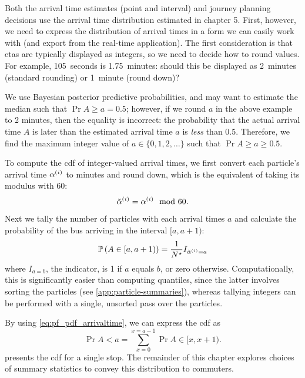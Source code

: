 Both the arrival time estimates (point and interval) and journey planning decisions use the arrival time distribution estimated in chapter 5. First, however, we need to express the distribution of arrival times in a form we can easily work with (and export from the real-time application). The first consideration is that \glspl{eta} are typically displayed as integers, so we need to decide how to round values. For example, 105~seconds is 1.75~minutes: should this be displayed as 2~minutes (standard rounding) or 1~minute (round down)?


We use Bayesian posterior predictive probabilities, and may want to estimate the median such that $\Pr{A \geq a} = 0.5$; however, if we round $a$ in the above example to 2 minutes, then the equality is incorrect: the probability that the actual arrival time $A$ is later than the estimated arrival time $a$ is \emph{less} than 0.5. Therefore, we find the maximum integer value of $a \in \{0, 1, 2, \ldots\}$ such that $\Pr{A \geq a} \geq 0.5$.


To compute the \gls{cdf} of integer-valued arrival times, we first convert each particle's arrival time $\alpha^{(i)}$ to minutes and round down, which is the equivalent of taking its modulus with 60:
\begin{equation}
\label{eq:particle_eta_modulus}
\breve{\alpha}^{(i)} = \alpha^{(i)} \mod 60.
\end{equation}
Next we tally the number of particles with each arrival times $a$ and calculate the probability of the bus arriving in the interval $[a,a+1)$:
\begin{equation}
\label{eq:pf_pdf_arrivaltime}
\mathbb{P}\left(A \in [a, a+1)\right) =
\frac{1}{N^\star} I_{\breve{\alpha}^{(i)} = a}
\end{equation}
where $I_{a=b}$, the indicator, is 1 if $a$ equals $b$, or zero otherwise. Computationally, this is significantly easier than computing quantiles, since the latter involves sorting the particles (see \cref{app:particle-summaries}), whereas tallying integers can be performed with a single, unsorted pass over the particles.


By using \cref{eq:pf_pdf_arrivaltime}, we can express the \gls{cdf} as
\begin{equation}
\label{eq:pf_pdf_arrivaltime}
\Pr{A < a} = \sum_{x=0}^{x=a-1} \Pr{A \in [x, x+1)}.
\end{equation}
 presents the \gls{cdf} for a single stop. The remainder of this chapter explores choices of summary statistics to convey this distribution to commuters.


